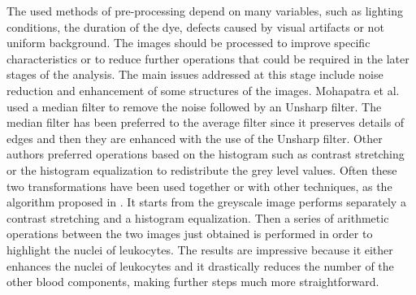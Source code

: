 \documentclass[final,a4paper,12pt,english]{UnicaPhdThesis3}
\begin{document}
The used methods of pre-processing depend on many variables, such as lighting conditions, the duration of the dye, defects caused by visual artifacts or not uniform background. The images should be processed to improve specific characteristics or to reduce further operations that could be required in the later stages of the analysis. The main issues addressed at this stage include noise reduction and enhancement of some structures of the images. Mohapatra et al. \cite{Mohapatra10a, Mohapatra10b, Mohapatra10c, Mohapatra14} used a median filter to remove the noise followed by an Unsharp filter. The median filter has been preferred to the average filter since it preserves details of edges and then they are enhanced with the use of the Unsharp filter. Other authors preferred operations based on the histogram such as contrast stretching or the histogram equalization to redistribute the grey level values. Often these two transformations have been used together or with other techniques, as the algorithm proposed in \cite{Madhloom}. It starts from the greyscale image performs separately a contrast stretching and a histogram equalization. Then a series of arithmetic operations between the two images just obtained is performed in order to highlight the nuclei of leukocytes. The results are impressive because it either enhances the nuclei of leukocytes and it drastically reduces the number of the other blood components, making further steps much more straightforward.
\end{document}
